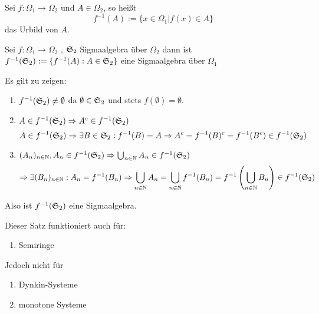 		\begin{defi}
			Sei $f:\Omega_1 \to \Omega_2$ und $A \in \Omega_2$, so heißt
			\[ f^{-1}(A):=\{ x \in \Omega_1 |f(x) \in A \} \]
			das Urbild von $A$.
		\end{defi}
		
		\begin{satz}
			Sei $f:\Omega_1 \to \Omega_2$ , $\mathfrak{S}_2$ Sigmaalgebra über $\Omega_2$ dann ist $ f^{-1}(\mathfrak{S}_2) := \{ f^{-1}(A) :A \in \mathfrak{S}_2 \} $ eine Sigmaalgebra über $\Omega_1$
		\end{satz}
		\begin{bew}
			Es gilt zu zeigen:
			\begin{enumerate}[1.]
				\item $ f^{-1}(\mathfrak{S}_2) \neq \emptyset $\newline
					da $\emptyset \in \mathfrak{S}_2$ und stets $f(\emptyset) = \emptyset$.
				\item $A \in f^{-1}(\mathfrak{S}_2) \Rightarrow A^c \in f^{-1}(\mathfrak{S}_2)$ \newline
					\[ A \in f^{-1}(\mathfrak{S}_2) \Rightarrow \exists B \in \mathfrak{S}_2:f^{-1}(B)=A \Rightarrow A^c=f^{-1}(B)^c=f^{-1}(B^c) \in f^{-1}(\mathfrak{S}_2) \]
				\item $ (A_n)_{n \in \mathbb{N}}, A_n \in f^{-1}(\mathfrak{S}_2) \Rightarrow \bigcup_{n \in \mathbb{N}} A_n \in f^{-1}(\mathfrak{S}_2) $
					\[ \Rightarrow \exists (B_n)_{n \in \mathbb{N}} : A_n = f^{-1}(B_n) \Rightarrow \bigcup_{n \in \mathbb{N}} A_n = \bigcup_{n \in \mathbb{N}} f^{-1}(B_n) =f^{-1} \left ( \bigcup_{n \in \mathbb{N}} B_n \right ) \in f^{-1}(\mathfrak{S}_2) \]
			\end{enumerate}
			Also ist $f^{-1}(\mathfrak{S}_2)$ eine Sigmaalgebra.
		\end{bew}
		
		\begin{bem}
			Dieser Satz funktioniert auch für:
			\begin{enumerate}[-]
				\item Semiringe
			\end{enumerate}
			Jedoch nicht für
			\begin{enumerate}[-]
				\item Dynkin-Systeme
				\item monotone Systeme
			\end{enumerate}
		\end{bem}
		
